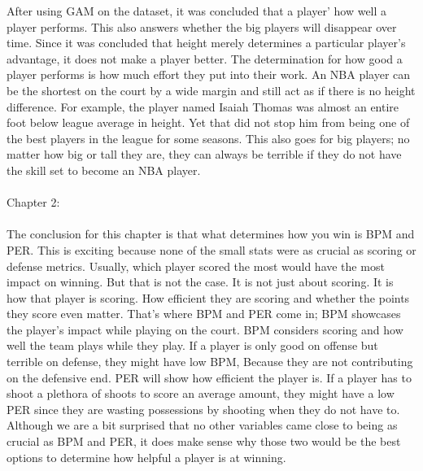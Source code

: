 \documentclass[11pt,letterpaper]{amsart}
\begin{document}
\indent After using GAM on the dataset, it was concluded that a player’ how well a player performs. This also answers whether the big players will disappear over time. Since it was concluded that height merely determines a particular player’s advantage, it does not make a player better. The determination for how good a player performs is how much effort they put into their work. An NBA player can be the shortest on the court by a wide margin and still act as if there is no height difference. For example, the player named Isaiah Thomas was almost an entire foot below league average in height. Yet that did not stop him from being one of the best players in the league for some seasons. This also goes for big players; no matter how big or tall they are, they can always be terrible if they do not have the skill set to become an NBA player.\\ \\

Chapter 2:\\\\

The conclusion for this chapter is that what determines how you win is BPM and PER. This is exciting because none of the small stats were as crucial as scoring or defense metrics. Usually, which player scored the most would have the most impact on winning. But that is not the case. It is not just about scoring. It is how that player is scoring. How efficient they are scoring and whether the points they score even matter. That’s where BPM and PER come in; BPM showcases the player’s impact while playing on the court. BPM considers scoring and how well the team plays while they play. If a player is only good on offense but terrible on defense, they might have low BPM, Because they are not contributing on the defensive end. PER will show how efficient the player is. If a player has to shoot a plethora of shoots to score an average amount, they might have a low PER since they are wasting possessions by shooting when they do not have to. Although we are a bit surprised that no other variables came close to being as crucial as BPM and PER, it does make sense why those two would be the best options to determine how helpful a player is at winning.
\end{document}
